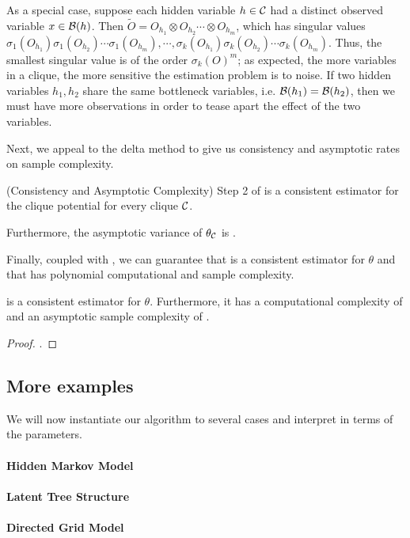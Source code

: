 As a special case, suppose each hidden variable $h \in \mathcal{C}$ had
  a distinct observed variable $x \in \mathcal{B}(h)$. 
Then $\tilde O = O_{h_1} \otimes O_{h_2} \cdots \otimes O_{h_m}$, which
  has singular values $\sigma_1(O_{h_1}) \sigma_1(O_{h_2}) \cdots
  \sigma_1(O_{h_m}), \cdots, \sigma_k(O_{h_1}) \sigma_k(O_{h_2}) \cdots
  \sigma_k(O_{h_m})$. 
Thus, the smallest singular value is of the order $\sigma_k(O)^m$; as
  expected, the more variables in a clique, the more sensitive the
  estimation problem is to noise.
If two hidden variables $h_1, h_2$ share the same bottleneck
  variables, i.e. $\mathcal{B}(h_1) = \mathcal{B}(h_2)$, then we must have more
  observations in order to tease apart the effect of the two
  variables\verify\reword.


Next, we appeal to the delta method to give us
  consistency and asymptotic rates on sample complexity.
\begin{corollary}(Consistency and Asymptotic Complexity)
  \label{cor:asymptotics}
  Step 2 of  is a consistent estimator for
  the clique potential for every clique $\mathcal{C}$.

  Furthermore, the asymptotic variance of $\theta_{\mathcal{C}}$ is
  .
\end{corollary}

Finally, coupled with , we can guarantee that
   is a consistent estimator for $\theta$ and 
  that has polynomial computational and sample complexity.
\begin{theorem}
   is a consistent estimator for $\theta$.
  Furthermore, it has a computational complexity of  and an
    asymptotic sample complexity of .
\end{theorem}
\begin{proof}
  .
\end{proof}

\subsection{More examples}

We will now instantiate our algorithm to several cases and interpret
 in terms of the parameters.

\paragraph{Hidden Markov Model}

\paragraph{Latent Tree Structure}

\paragraph{Directed Grid Model}

